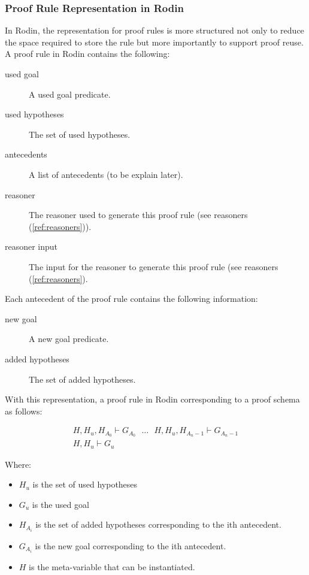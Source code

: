 
\subsubsection{Proof Rule Representation in Rodin}

In Rodin, the representation for proof rules is more structured not only to reduce the space required to store the rule but more importantly to support proof reuse.
A proof rule in Rodin contains the following:

\begin{description}
	\item[used goal] A used goal predicate. 
	\item[used hypotheses] The set of used hypotheses. 
	\item[antecedents] A list of antecedents (to be explain later). 
	\item[reasoner] The reasoner used to generate this proof rule (see reasoners (\ref{ref:reasoners})). 
	\item[reasoner input] The input for the reasoner to generate this proof rule (see reasoners (\ref{ref:reasoners}). 
\end{description}

Each antecedent of the proof rule contains the following information:

\begin{description}
	\item[new goal] A new goal predicate. 
	\item[added hypotheses] The set of added hypotheses. 
\end{description}

With this representation, a proof rule in Rodin corresponding to a proof schema as follows: 

$$\begin{array}{c} H, H_u, H_{A_0} \vdash G_{A_0} ~~~\ldots~~~ H, H_u, H_{A_n-1} \vdash G_{A_n-1} \\ \hline H, H_u \vdash G_u \end{array} $$

Where:
\begin{itemize}
	\item     $H_u$ is the set of used hypotheses 
	\item     $G_u$ is the used goal 
	\item     $H_{A_i}$ is the set of added hypotheses corresponding to the ith antecedent. 
	\item     $G_{A_i}$ is the new goal corresponding to the ith antecedent. 
	\item     $H$ is the meta-variable that can be instantiated. 
\end{itemize}

